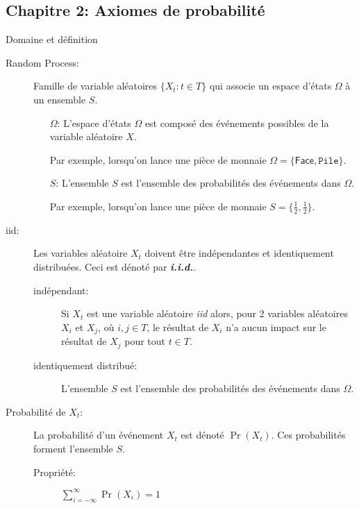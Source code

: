 \documentclass[10pt, french]{article}
\begin{document}
\begin{multicols*}{3}
\pagebreak
\section{Chapitre 2: Axiomes de probabilité}
\begin{rappel}{Domaine et définition}
\begin{description}
	\item[Random Process:]	Famille de variable aléatoires $\{X_{t}: t \in T\}$ qui associe un espace d'états $\Omega$ à un ensemble $S$.
	\begin{enumerate}
		\item[$\Omega$: ] L'espace d'états $\Omega$ est composé des événements possibles de la variable aléatoire $X$.
		\item[] Par exemple, lorsqu'on lance une pièce de monnaie $\Omega = \{\textsf{Face}, \texttt{Pile} \}$.
		\item[$S$: ] L'ensemble $S$ est l'ensemble des probabilités des événements dans $\Omega$.
		\item[] Par exemple, lorsqu'on lance une pièce de monnaie $S = \{\frac{1}{2}, \frac{1}{2} \}$.
	\end{enumerate}
\end{description}
\begin{description}
	\item[iid: ]	Les variables aléatoire $X_{t}$ doivent être indépendantes et identiquement distribuées. Ceci est dénoté par \textit{\textbf{i.i.d.}}.				
	\begin{description}
		\item[indépendant: ] Si $X_{t}$ est une variable aléatoire \textit{iid} alors, pour 2 variables aléatoires $X_{i}$ et $X_{j}$, où $i, j \in T$, le résultat de $X_{i}$ n'a aucun impact sur le résultat de $X_{j}$ pour tout $t \in T$.
		\item[identiquement distribué: ] L'ensemble $S$ est l'ensemble des probabilités des événements dans $\Omega$.
	\end{description}
	\item[Probabilité de $X_{t}$: ]	La probabilité d'un événement $X_{t}$ est dénoté $\Pr(X_{t})$. 
	Ces probabilités forment l'ensemble $S$.
	\begin{description}
		\item[Propriété: ] $\sum_{i = -\infty}^{\infty} \Pr(X_{i}) = 1$
	\end{description}

\end{description}
\end{rappel}
\end{multicols*}
\end{document}
